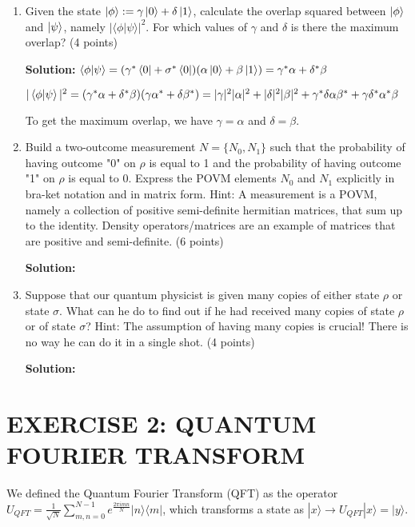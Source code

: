 \documentclass[12pt]{article}
\begin{document}
\begin{enumerate}[start=4]
    \item Given the state $\ket{\phi} := \gamma\ket{0}+\delta\ket{1}$, calculate the overlap squared between $\ket{\phi}$ and $\ket{\psi}$, namely $|\langle\phi|\psi\rangle|^2$. For which values of $\gamma$ and $\delta$ is there the maximum overlap? (4 points)

          \textbf{Solution:}
          $\braket{\phi|\psi} = (\gamma^*\bra{0}+\sigma^*\bra{0})(\alpha\ket{0}+\beta\ket{1}) = \gamma^*\alpha+\delta^*\beta$

          $|\braket{\phi|\psi}|^2 = (\gamma^*\alpha+\delta^*\beta)(\gamma\alpha^*+\delta\beta^*) = |\gamma|^2|\alpha|^2+|\delta|^2|\beta|^2+\gamma^*\delta\alpha\beta^*+\gamma\delta^*\alpha^*\beta$

          To get the maximum overlap, we have $\gamma=\alpha$ and $\delta=\beta$.
    \item Build a two-outcome measurement $N = \{N_0, N_1\}$ such that the probability of having outcome "0" on $\rho$ is equal to 1 and the probability of having outcome "1" on $\rho$ is equal to 0. Express the POVM elements $N_0$ and $N_1$ explicitly in bra-ket notation and in matrix form. Hint: A measurement is a POVM, namely a collection of positive semi-definite hermitian matrices, that sum up to the identity. Density operators/matrices are an example of matrices that are positive and semi-definite. (6 points)

          \textbf{Solution:}



    \item Suppose that our quantum physicist is given many copies of either state $\rho$ or state $\sigma$. What can he do to find out if he had received many copies of state $\rho$ or of state $\sigma$? Hint: The assumption of having many copies is crucial! There is no way he can do it in a single shot. (4 points)

          \textbf{Solution:}
\end{enumerate}

\section{EXERCISE 2: QUANTUM FOURIER TRANSFORM}

We defined the Quantum Fourier Transform (QFT) as the operator $U_{QFT} = \frac{1}{\sqrt{N}} \sum_{m,n=0}^{N-1} e^{\frac{2\pi i mn}{N}} |n\rangle\langle m|$, which transforms a state as $|x\rangle \rightarrow U_{QFT}|x\rangle = |y\rangle$.
\end{document}
